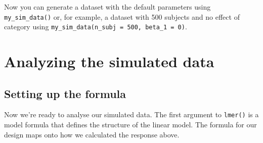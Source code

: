 \documentclass[
  english,
  doc,floatsintext]{apa6}
\newenvironment{Shaded}{\begin{snugshade}}{\end{snugshade}}
\newcommand{\DataTypeTok}[1]{\textcolor[rgb]{0.13,0.29,0.53}{#1}}
\newcommand{\DecValTok}[1]{\textcolor[rgb]{0.00,0.00,0.81}{#1}}
\newcommand{\KeywordTok}[1]{\textcolor[rgb]{0.13,0.29,0.53}{\textbf{#1}}}
\newcommand{\NormalTok}[1]{#1}
\newcommand{\OperatorTok}[1]{\textcolor[rgb]{0.81,0.36,0.00}{\textbf{#1}}}
\newcommand{\StringTok}[1]{\textcolor[rgb]{0.31,0.60,0.02}{#1}}
\begin{document}
\begin{Shaded}
\end{Shaded}

Now you can generate a dataset with the default parameters using \texttt{my\_sim\_data()} or, for example, a dataset with 500 subjects and no effect of category using \texttt{my\_sim\_data(n\_subj\ =\ 500,\ beta\_1\ =\ 0)}.

\hypertarget{analyzing-the-simulated-data}{%
\section{Analyzing the simulated data}\label{analyzing-the-simulated-data}}

\hypertarget{setting-up-the-formula}{%
\subsection{Setting up the formula}\label{setting-up-the-formula}}

Now we're ready to analyse our simulated data. The first argument to \texttt{lmer()} is a model formula that defines the structure of the linear model. The formula for our design maps onto how we calculated the response above.
\end{document}
